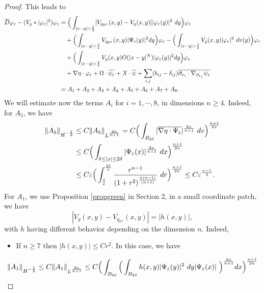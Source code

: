 \documentclass[10pt,a4paper]{amsart}
\def \R {\mathbb{R}}
\begin{document}
\begin{proof}
\noindent
This leads to 
\begin{align}
\overline{D}\varphi_{\varepsilon}-(V_{g}*|\varphi_{\varepsilon}|^{2})\varphi_{\varepsilon}&=\Big(\int_{|x-y|<\frac{\delta}{2}}[V_{g_{\R^{n}}}(x,y)-V_{g}(x,y)]|\varphi_{\varepsilon}(y)|^{2}\ dy \Big) \varphi_{\varepsilon}\notag\\
&\quad+\Big(\int_{|x-y|>\frac{\delta}{2}}V_{g_{\R^{n}}}(x,y)|\Psi_{\varepsilon}(y)|^{2} dy\Big) \varphi_{\varepsilon}-\Big(\int_{|x-y|>\frac{\delta}{2}}V_{g}(x,y)|\varphi_{\varepsilon}|^{2}\ dv(y) \Big) \varphi_{\varepsilon} \notag\\
&\quad+\Big(\int_{|x-y|<\frac{\delta}{2}}V_{g}(x,y)O(|x-y|^{N})|\varphi_{\varepsilon}(y)|^{2}dy\Big)\varphi_{\varepsilon}\notag\\
&\quad +\nabla \eta \cdot \varphi_{\varepsilon} + \Omega\cdot \overline{\psi_{\varepsilon}}+X\cdot \overline{\psi}+\sum_{i,j}(b_{ij}-\delta_{ij})\overline{\partial_{x_{i}}\cdot \nabla_{\partial_{x_{j}}}\psi_{\varepsilon}}\notag\\
&=A_{1}+A_{2}+A_{3}+A_{4}+A_{5}+A_{6}+A_{7}+A_{8}.\notag
\end{align}
We will estimate now the terms $A_{i}$ for $i=1,\cdots,8$, in dimensions $n\geq 4$. Indeed, for $A_{5}$, we have
\begin{align}
\|A_{5}\|_{H^{-\frac{1}{2}}}&\leq C\|A_{5}\|_{L^{\frac{2n}{n+1}}}=C\Big(\int_{B_{2\delta}}|\overline{\nabla \eta \cdot \Psi_{\varepsilon}}|^{\frac{2n}{n+1}}\ dv \Big)^{\frac{n+1}{2n}}\notag\\
&\leq C\Big(\int_{\delta\leq |x|\leq 2\delta}|\Psi_{\varepsilon}(x)|^{\frac{2n}{n+1}}\ dx \Big)^{\frac{n+1}{2n}}\notag\\
&\leq C \varepsilon \Big(\int_{\frac{\delta}{\varepsilon}}^{\frac{2\delta}{\varepsilon}}\frac{r^{n-1}}{(1+r^{2})^{\frac{n(n-1)}{(n+1)}}}\ dr \Big)^{\frac{n+1}{2n}}\leq C \varepsilon^{\frac{n-1}{2}}.\notag
\end{align}
For $A_{1}$, we use Proposition \ref{propgreen}  in Section 2, in a small coordinate patch, we have 
$$|V_{g}(x,y)-V_{g_{\R^{n}}}(x,y)|=|h(x,y)|,$$ 
with $h$ having different behavior depending on the dimension $n$. Indeed,
\begin{itemize}
\item If $n\geq 7$ then $|h(x,y)|\leq Cr^{2}$. In this case, we have
\end{itemize}
\begin{align}
\|A_{1}\|_{H^{-\frac{1}{2}}}&\leq C\|A_{1}\|_{L^{\frac{2n}{n+1}}}\leq C\Big(\int_{B_{2\delta}}\Big(\int_{B_{2\delta}}h(x,y)|\Psi_{\varepsilon}(y)|^{2}\ dy |\Psi_{\varepsilon}(x)|\ \Big)^{\frac{2n}{n+1}}dx\Big)^{\frac{n+1}{2n}}\notag\\

\end{align}
\end{proof}
\end{document}
